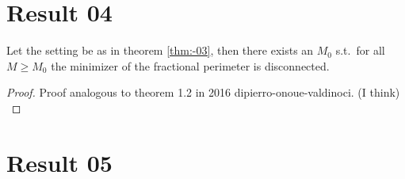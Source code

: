 \section{Result 04}
\label{sec:-05}

\begin{theorem}
	\label{thm:-04}
	Let the setting be as in theorem \cref{thm:-03}, then there exists an \( M_0 \) s.t.\
	for all \( M \geq M_0 \) the minimizer of the fractional perimeter is disconnected.
\end{theorem}
\begin{proof}
	Proof analogous to theorem 1.2 in 2016 dipierro-onoue-valdinoci. (I think) \\
\end{proof}

\section{Result 05}
\label{sec:-06}

